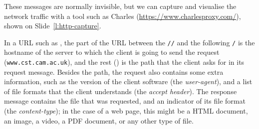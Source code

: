 \begin{frame}[plain]
    \label{s:http-capture}
\end{frame}
\label{l:http-capture}

These messages are normally invisible, but we can capture and visualise the network traffic with a tool such as Charles (\url{https://www.charlesproxy.com/}), shown on Slide~\ref{l:http-capture}.


In a URL such as \courseurl, the part of the URL between the \verb|//| and the following \verb|/| is the hostname of the server to which the client is going to send the request (\texttt{www.cst.cam.ac.uk}), and the rest (\texttt{\coursepath}) is the path that the client asks for in its request message.
Besides the path, the request also contains some extra information, such as the version of the client software (the \emph{user-agent}), and a list of file formats that the client understands (the \emph{accept header}).
The response message contains the file that was requested, and an indicator of its file format (the \emph{content-type}); in the case of a web page, this might be a HTML document, an image, a video, a PDF document, or any other type of file.

